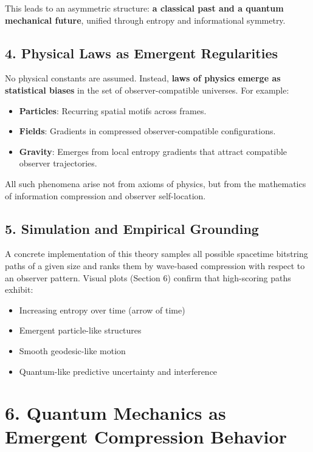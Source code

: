 \documentclass[11pt]{article}
\begin{document}
This leads to an asymmetric structure: \textbf{a classical past and a quantum mechanical future}, unified through entropy and informational symmetry.

\subsection*{4. Physical Laws as Emergent Regularities}

No physical constants are assumed. Instead, \textbf{laws of physics emerge as statistical biases} in the set of observer-compatible universes. For example:

\begin{itemize}
      \item \textbf{Particles}: Recurring spatial motifs across frames.
      \item \textbf{Fields}: Gradients in compressed observer-compatible configurations.
      \item \textbf{Gravity}: Emerges from local entropy gradients that attract compatible observer trajectories.
\end{itemize}

All such phenomena arise not from axioms of physics, but from the mathematics of information compression and observer self-location.

\subsection*{5. Simulation and Empirical Grounding}

A concrete implementation of this theory samples all possible spacetime bitstring paths of a given size and ranks them by wave-based compression with respect to an observer pattern. Visual plots (Section 6) confirm that high-scoring paths exhibit:

\begin{itemize}
      \item Increasing entropy over time (arrow of time)
      \item Emergent particle-like structures
      \item Smooth geodesic-like motion
      \item Quantum-like predictive uncertainty and interference
\end{itemize}

\section*{6. Quantum Mechanics as Emergent Compression Behavior}
\end{document}
